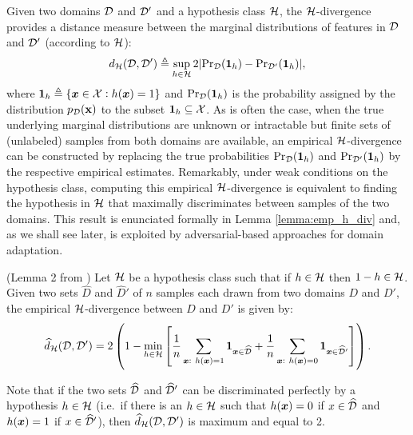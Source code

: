 Given two domains ${\mathcal{D}}$ and ${\mathcal{D}}'$ and a hypothesis class ${\mathcal{H}}$, the ${\mathcal{H}}$-divergence provides a distance measure between the marginal distributions of features in ${\mathcal{D}}$ and ${\mathcal{D}}'$ (according to ${\mathcal{H}}$):
\begin{equation*}
	\label{eq:h_div}
	d_{{\mathcal{H}}}({\mathcal{D}},{\mathcal{D}}') \triangleq \sup_{h \in {\mathcal{H}}} 2 |\mathrm{Pr}_{{\mathcal{D}}}(\bm{1}_h) - \mathrm{Pr}_{{\mathcal{D}}'}(\bm{1}_h)|,
\end{equation*}
where $\bm{1}_h \triangleq \{{\bm{x}} \in {\mathcal{X}}: h({\bm{x}})=1\}$ and $\mathrm{Pr}_{{\mathcal{D}}}(\bm{1}_h)$ is the probability assigned by the distribution $p_{\mathcal{D}}({\mathbf{x}})$ to the subset $\bm{1}_h \subseteq {\mathcal{X}}$. As is often the case, when the true underlying marginal distributions are unknown or intractable but finite sets of (unlabeled) samples from both domains are available, an empirical ${\mathcal{H}}$-divergence can be constructed by replacing the true probabilities $\mathrm{Pr}_{{\mathcal{D}}}(\bm{1}_h)$ and $\mathrm{Pr}_{{\mathcal{D}}'}(\bm{1}_h)$ by the respective empirical estimates. Remarkably, under weak conditions on the hypothesis class, computing this empirical ${\mathcal{H}}$-divergence is equivalent to finding the hypothesis in ${\mathcal{H}}$ that maximally discriminates between samples of the two domains. This result is enunciated formally in Lemma \ref{lemma:emp_h_div} and, as we shall see later, is exploited by adversarial-based approaches for domain adaptation.
\begin{lemma}
	\label{lemma:emp_h_div}
	(Lemma 2 from \citet{BenDavid2010}) Let ${\mathcal{H}}$ be a hypothesis class such that if $h \in {\mathcal{H}}$ then $1-h \in {\mathcal{H}}$. Given two sets $\widehat{D}$ and $\widehat{D}'$ of $n$ samples each drawn from two domains $D$ and $D'$, the empirical ${\mathcal{H}}$-divergence between $D$ and $D'$ is given by:
	\begin{equation}
		\widehat{d}_{{\mathcal{H}}}({\mathcal{D}},{\mathcal{D}}') = 2 \left(1 - \min_{h \in {\mathcal{H}}} \left[\frac{1}{n} \sum_{{\bm{x}}:~h({\bm{x}})=1} \bm{1}_{{\bm{x}} \in \widehat{{\mathcal{D}}}} + \frac{1}{n} \sum_{{\bm{x}}:~h({\bm{x}})=0} \bm{1}_{{\bm{x}} \in \widehat{{\mathcal{D}}}'}\right]\right).
	\end{equation}
\end{lemma}
Note that if the two sets $\widehat{{\mathcal{D}}}$ and $\widehat{{\mathcal{D}}}'$ can be discriminated perfectly by a hypothesis $h \in {\mathcal{H}}$ (i.e.\ if there is an $h \in {\mathcal{H}}$ such that $h({\bm{x}}) = 0$ if $x \in \widehat{{\mathcal{D}}}$ and $h({\bm{x}}) = 1$ if $x \in \widehat{{\mathcal{D}}}'$), then $\widehat{d}_{{\mathcal{H}}}({\mathcal{D}},{\mathcal{D}}')$ is maximum and equal to 2.

